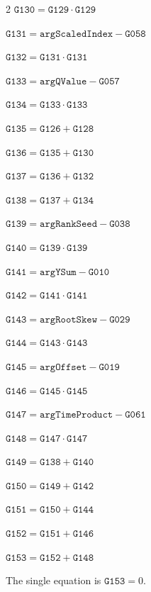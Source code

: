 \documentclass[10pt]{article}
\begin{document}
\begin{multicols}{2}
\noindent $\mathtt{G130}=\mathtt{G129}\cdot \mathtt{G129}$\par
\noindent $\mathtt{G131}=\mathtt{argScaledIndex}-\mathtt{G058}$\par
\noindent $\mathtt{G132}=\mathtt{G131}\cdot \mathtt{G131}$\par
\noindent $\mathtt{G133}=\mathtt{argQValue}-\mathtt{G057}$\par
\noindent $\mathtt{G134}=\mathtt{G133}\cdot \mathtt{G133}$\par
\noindent $\mathtt{G135}=\mathtt{G126}+\mathtt{G128}$\par
\noindent $\mathtt{G136}=\mathtt{G135}+\mathtt{G130}$\par
\noindent $\mathtt{G137}=\mathtt{G136}+\mathtt{G132}$\par
\noindent $\mathtt{G138}=\mathtt{G137}+\mathtt{G134}$\par
\noindent $\mathtt{G139}=\mathtt{argRankSeed}-\mathtt{G038}$\par
\noindent $\mathtt{G140}=\mathtt{G139}\cdot \mathtt{G139}$\par
\noindent $\mathtt{G141}=\mathtt{argYSum}-\mathtt{G010}$\par
\noindent $\mathtt{G142}=\mathtt{G141}\cdot \mathtt{G141}$\par
\noindent $\mathtt{G143}=\mathtt{argRootSkew}-\mathtt{G029}$\par
\noindent $\mathtt{G144}=\mathtt{G143}\cdot \mathtt{G143}$\par
\noindent $\mathtt{G145}=\mathtt{argOffset}-\mathtt{G019}$\par
\noindent $\mathtt{G146}=\mathtt{G145}\cdot \mathtt{G145}$\par
\noindent $\mathtt{G147}=\mathtt{argTimeProduct}-\mathtt{G061}$\par
\noindent $\mathtt{G148}=\mathtt{G147}\cdot \mathtt{G147}$\par
\noindent $\mathtt{G149}=\mathtt{G138}+\mathtt{G140}$\par
\noindent $\mathtt{G150}=\mathtt{G149}+\mathtt{G142}$\par
\noindent $\mathtt{G151}=\mathtt{G150}+\mathtt{G144}$\par
\noindent $\mathtt{G152}=\mathtt{G151}+\mathtt{G146}$\par
\noindent $\mathtt{G153}=\mathtt{G152}+\mathtt{G148}$\par
\end{multicols}
\noindent The single equation is $\boxed{\mathtt{G153}=0}$.
\par\medskip
\end{document}
